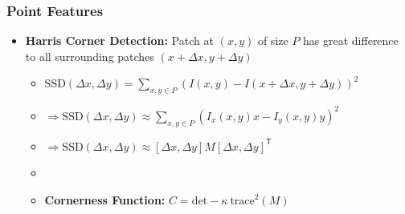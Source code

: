 \documentclass[a4paper]{article}
\newcommand{\ides}[1]{\item \textbf{#1}}
\newcommand{\transpose}{\mathsf{T}}
\begin{document}
\subsubsection{Point Features}
\begin{itemize}
    \ides{Harris Corner Detection:} Patch at $(x,y)$ of size $P$ has great difference to all surrounding patches $(x + \Delta x, y + \Delta y)$
        \begin{itemize}
            \item $\mathrm{SSD}(\Delta x, \Delta y) = \sum_{x,y \in P}(I(x,y) - I(x + \Delta x, y + \Delta y))^2$
            \item $\Rightarrow \mathrm{SSD}(\Delta x, \Delta y) \approx \sum_{x,y \in P}(I_x(x,y)x - I_y(x, y)y)^2$
                \\ 
            \item $\Rightarrow \mathrm{SSD}(\Delta x, \Delta y) \approx [\Delta x, \Delta y]M[\Delta x, \Delta y]^\transpose$
                \\ 
            \item {}
            \ides{Cornerness Function:} $C = \text{det} - \kappa \ \text{trace}^2(M)$

\end{itemize}
\end{itemize}
\end{document}
